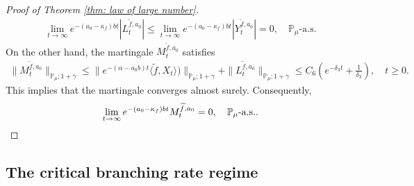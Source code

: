 \documentclass[12pt,a4paper]{amsart}
\theoremstyle{plain}
\theoremstyle{definition}
\numberwithin{equation}{section}
\begin{document}
\begin{proof}[Proof of Theorem \ref{thm: law of large number}]
\begin{align}
  \lim_{t\rightarrow \infty}e^{-(a_0 - \kappa_f)bt}|L_t^{\widetilde{f},a_0}|
  \leq  \lim_{t\rightarrow \infty}e^{-(a_0 - \kappa_f)bt}|Y_t^{\widetilde{f},a_0}|=0, \quad
  \mathbb P_\mu\text{-a.s.}
\end{align}
On the other hand, the martingale $M_t^{\widetilde{f},a_0}$ satisfies
\begin{align}
  \|M_t^{\widetilde{f},a_0}\|_{\mathbb{P}_{\mu};1+\gamma}
  \leq \|e^{-(\alpha-a_0 b)t}\langle \widetilde{f},X_t\rangle)\|_{\mathbb{P}_{\mu};1+\gamma}+\|L_t^{\widetilde{f},a_0}\|_{\mathbb{P}_{\mu};1+\gamma}
  \leq C_6(e^{-\delta_3 t}+\frac{1}{\delta_3}),
  \quad t\geq 0.
\end{align}
This implies that the martingale converges almost surely.
Consequently,
\[
	\lim_{t\rightarrow\infty} e^{-(a_0-\kappa_f)bt}M_t^{\widetilde{f},a_0}
	= 0,
	\quad \mathbb P_\mu\text{-a.s.}.
  \qedhere
\]
\end{proof}

\subsection{The critical branching rate regime}
\label{sec:critical}
\end{document}
